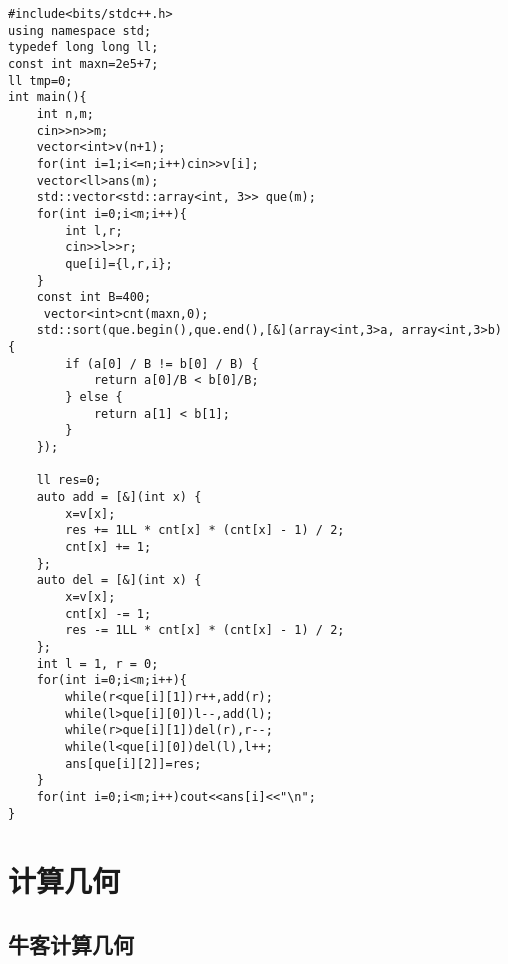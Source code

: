 \documentclass[a4paper,10pt]{article}
\begin{document}
\noindent\begin{lstlisting}
#include<bits/stdc++.h>
using namespace std;
typedef long long ll;
const int maxn=2e5+7;
ll tmp=0;
int main(){
    int n,m;
    cin>>n>>m;
    vector<int>v(n+1);
    for(int i=1;i<=n;i++)cin>>v[i];
    vector<ll>ans(m);
    std::vector<std::array<int, 3>> que(m);
    for(int i=0;i<m;i++){
        int l,r;
        cin>>l>>r;
        que[i]={l,r,i};
    }
    const int B=400;
     vector<int>cnt(maxn,0);
    std::sort(que.begin(),que.end(),[&](array<int,3>a, array<int,3>b) {
        if (a[0] / B != b[0] / B) {
            return a[0]/B < b[0]/B;
        } else {
            return a[1] < b[1];
        }
    });
    
    ll res=0;
    auto add = [&](int x) {
        x=v[x];
        res += 1LL * cnt[x] * (cnt[x] - 1) / 2;
        cnt[x] += 1;
    };
    auto del = [&](int x) {
        x=v[x];
        cnt[x] -= 1;
        res -= 1LL * cnt[x] * (cnt[x] - 1) / 2;
    };
    int l = 1, r = 0;
    for(int i=0;i<m;i++){
        while(r<que[i][1])r++,add(r);
        while(l>que[i][0])l--,add(l);
        while(r>que[i][1])del(r),r--;
        while(l<que[i][0])del(l),l++;
        ans[que[i][2]]=res;
    }
    for(int i=0;i<m;i++)cout<<ans[i]<<"\n";
}\end{lstlisting}

\section{计算几何}
\thispagestyle{fancy}

\subsection{牛客计算几何}
\thispagestyle{fancy}
\end{document}
